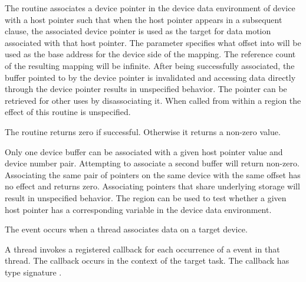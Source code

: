 \begin{ccppspecific}
\begin{figure}[t!]
\end{figure}

\effect

The  routine associates a device pointer
in the device data environment of device 
with a host pointer such that when the host pointer appears in a subsequent
 clause, the associated device pointer is used as the target for
data motion associated with that host pointer.  The 
parameter specifies what offset into  will be used as the
base address for the device side of the mapping.  The reference count of the
resulting mapping will be infinite.  After being successfully associated, the
buffer pointed to by the device pointer is invalidated and accessing data
directly through the device pointer results in unspecified behavior.  The
pointer can be retrieved for other uses by disassociating it.
When called from within a  region 
the effect of this routine is unspecified.

The routine returns zero if successful. Otherwise it returns a non-zero value.

Only one device buffer can be associated with a given host pointer value and
device number pair. Attempting to associate a second buffer will return
non-zero. Associating the same pair of pointers on the same device with the
same offset has no effect and returns zero.  Associating pointers that share
underlying storage will result in unspecified behavior. The
 region can be used to test whether a given
host pointer has a corresponding variable in the device data environment.

\events
The  event occurs when a thread associates data on a target device.

\begin{figure}[t!]
\end{figure}

\tools

A thread invokes a registered 
callback for each occurrence of a  event in that thread. 
The callback occurs in the context of the target task.  The callback has type signature
. 


\end{ccppspecific}
